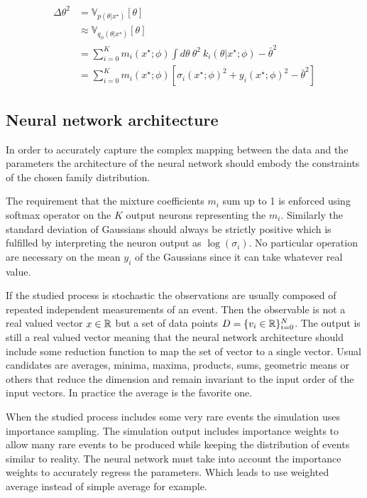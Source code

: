 \begin{align}
    \Delta\theta^2 & = \mathbb V_{p(\theta | x^\star)}[\theta] \\
    & \approx \mathbb V_{q_\phi(\theta | x^\star)}[\theta] \\
    & = \sum_{i=0}^K m_i(x^\star ; \phi) \int d\theta ~ \theta^2 ~ k_i(\theta | x^\star ; \phi) - \bar \theta^2 \\
    & = \sum_{i=0}^K m_i(x^\star ; \phi) \left [ \sigma_i(x^\star ; \phi)^2 + y_i(x^\star ; \phi)^2 - \bar \theta^2 \right ]
\end{align}

\subsection{Neural network architecture}

In order to accurately capture the complex mapping between the data and the parameters the architecture of the neural network should embody the constraints of the chosen family distribution.

The requirement that the mixture coefficients $m_i$ sum up to 1 is enforced using softmax operator on the $K$ output neurons representing the $m_i$.
Similarly the standard deviation of Gaussians should always be strictly positive which is fulfilled by interpreting the neuron output as $\log(\sigma_i)$.
No particular operation are necessary on the mean $y_i$ of the Gaussians since it can take whatever real value.

If the studied process is stochastic the observations are usually composed of repeated independent measurements of an event.
Then the observable is not a real valued vector $x \in \mathbb{R}$ but a set of data points $D = \{v_i \in \mathbb{R} \}_{i=0}^N$.
The output is still a real valued vector meaning that the neural network architecture should include some reduction function to map the set of vector to a single vector.
Usual candidates are averages, minima, maxima, products, sums, geometric means or others that reduce the dimension and remain invariant to the input order of the input vectors.
In practice the average is the favorite one.

When the studied process includes some very rare events the simulation uses importance sampling. 
The simulation output includes importance weights to allow many rare events to be produced while keeping the distribution of events similar to reality.
The neural network must take into account the importance weights to accurately regress the parameters.
Which leads to use weighted average instead of simple average for example.

